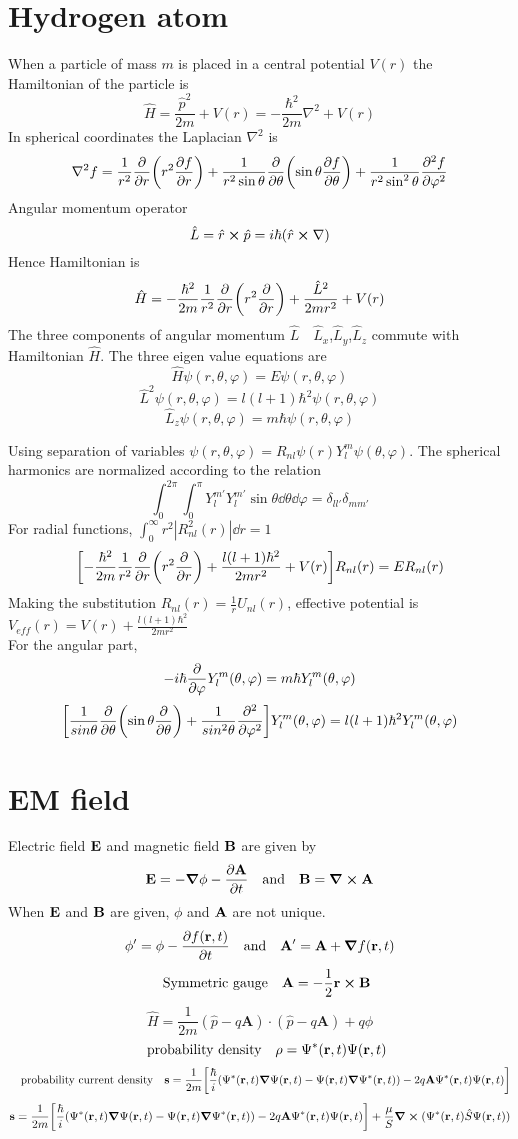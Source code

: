 \documentclass[12pt]{article}
\begin{document}
\section{Hydrogen atom}
When a particle of mass $m$ is placed in a central potential $V(r)$ the Hamiltonian of the particle is \[\hat{H}=\frac{\hat{p}^2}{2m}+V(r)=-\frac{\hbar^2}{2m}\nabla^2+V(r)\] 
In spherical coordinates the Laplacian $\nabla^2$ is \[\nabla^2f=\frac{1}{r^2}\pdv{r}\qty(r^2\pdv{f}{r})+\frac{1}{r^2\sin\theta}\pdv{\theta}\qty(\sin\theta\pdv{f}{\theta})+\frac{1}{r^2\sin^2\theta}\pdv[2]{f}{\varphi}\] 
Angular momentum operator \[\hat{L}=\hat{r}\cp\hat{p}=i\hbar(\hat{r}\cp\nabla)\]
Hence Hamiltonian is \[\hat{H}=-\frac{\hbar^2}{2m}\frac{1}{r^2}\pdv{r}\qty(r^2\pdv{r})+\frac{\hat{L}^2}{2mr^2}+V(r)\]
The three components of angular momentum $\hat{L}\quad$$\hat{L}_x$,$\hat{L}_y$,$\hat{L}_z$ commute with Hamiltonian $\hat{H}$.
The three eigen value equations are 
\[\hat{H}\psi(r,\theta,\varphi)=E\psi(r,\theta,\varphi)\]
\[\hat{L}^2\psi(r,\theta,\varphi)=l(l+1)\hbar^2\psi(r,\theta,\varphi)\]
\[\hat{L}_z\psi(r,\theta,\varphi)=m\hbar\psi(r,\theta,\varphi)\]

Using separation of variables $\psi(r,\theta,\varphi)=R_{nl}\psi(r)Y^m_l\psi(\theta,\varphi)$.
The spherical harmonics are normalized according to the relation \[\int_{0}^{2\pi}\int_{0}^{\pi}Y^{m'}_{l}Y^{m'}_{l}\sin\theta\dd\theta\dd\varphi=\delta_{ll'}\delta_{mm'}\]
For radial functions, $\int_{0}^{\infty}r^2|R_{nl}^2(r)|\dd{r}=1$
\[\qty[-\frac{\hbar^2}{2m}\frac{1}{r^2}\pdv{r}\qty(r^2\pdv{r})+\frac{l(l+1)\hbar^2}{2mr^2}+V(r)]R_{nl}(r)=ER_{nl}(r)\]
Making the substitution $R_{nl}(r)=\frac{1}{r}U_{nl}(r)$, effective potential is $V_{eff}(r)=V(r)+\frac{l(l+1)\hbar^2}{2mr^2}$
\\
For the angular part, \[-i\hbar\pdv{\varphi}Y^m_l(\theta,\varphi)=m\hbar Y^m_l(\theta,\varphi)\]
\[\qty[\frac{1}{sin\theta}\pdv{\theta}\qty(\sin\theta\pdv{\theta})+\frac{1}{sin^2\theta}\pdv[2]{\varphi}]Y^m_l(\theta,\varphi)=l(l+1)\hbar^2 Y^m_l(\theta,\varphi)\]
\section{EM field}
Electric field $\vb{E}$ and magnetic field $\vb{B}$
are given by \[\vb{E}=-\grad{\phi}-\pdv{\vb{A}}{t}\qq{and}\vb{B}=\curl{\vb{A}}\]
When $\vb{E}$ and $\vb{B}$ are given, $\phi$ and $\vb{A}$ are not unique.
\[\phi'=\phi-\pdv{f(\vb{r},t)}{t}\qq{and}\vb{A'}=\vb{A}+\grad{f(\vb{r},t)}\]
\[\qq{Symmetric gauge} \vb{A}=-\frac{1}{2}\vb{r}\cp\vb{B}\]
\[\hat{H}=\frac{1}{2m}(\hat{p}-q\mathbf{A})\cdot(\hat{p}-q\mathbf{A})+ q\phi\]
\[\qq{probability density}\rho=\Psi^*(\vb{r},t)\Psi(\vb{r},t)\]
\[\qq{probability current density}\vb{s}=\frac{1}{2m}\qty[\frac{\hbar}{i}(\Psi^*(\vb{r},t)\grad{\Psi(\vb{r},t)}-\Psi(\vb{r},t)\grad{\Psi^*(\vb{r},t)})-2q\vb{A}\Psi^*(\vb{r},t)\Psi(\vb{r},t)]\]
\[\vb{s}=\frac{1}{2m}\qty[\frac{\hbar}{i}(\Psi^*(\vb{r},t)\grad{\Psi(\vb{r},t)}-\Psi(\vb{r},t)\grad{\Psi^*(\vb{r},t)})-2q\vb{A}\Psi^*(\vb{r},t)\Psi(\vb{r},t)]+\frac{\mu}{S}\curl{(\Psi^*(\vb{r},t)\hat{S}\Psi(\vb{r},t))}\]
\end{document}
